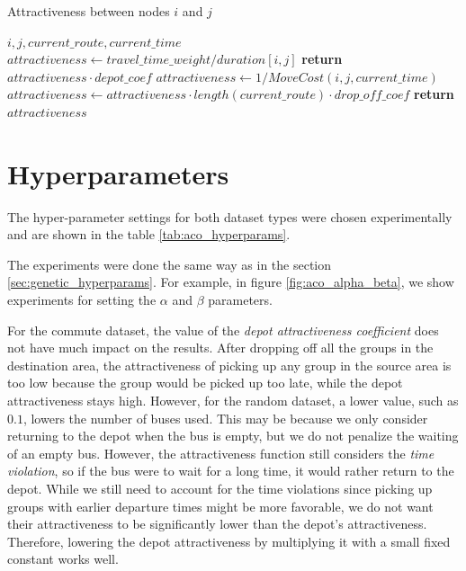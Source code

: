 \begin{algorithm}
\caption{Attractiveness between nodes $i$ and $j$}
\label{alg:aco_attractiveness}
\begin{algorithmic}
\Require $i, j, current\_route, current\_time$
    \State $attractiveness \gets {travel\_time\_weight} / {duration[i, j]}$ 
    \State \textbf{return} $attractiveness \cdot depot\_coef$ 
\EndIf
\State $attractiveness \gets 1 / MoveCost(i, j, current\_time)$  
    \State $attractiveness \gets attractiveness \cdot length(current\_route) \cdot drop\_off\_coef$
\EndIf
\State \textbf{return} $attractiveness$
\end{algorithmic}
\end{algorithm}

\section{Hyperparameters}\label{sec:aco_hyperparams}

The hyper-parameter settings for both dataset types were chosen experimentally and are shown in the table \ref{tab:aco_hyperparams}. 

The experiments were done the same way as in the section \ref{sec:genetic_hyperparams}. For example, in figure \ref{fig:aco_alpha_beta}, we show experiments for setting the $\alpha$ and $\beta$ parameters.

For the commute dataset, the value of the \textit{depot attractiveness coefficient} does not have much impact on the results. After dropping off all the groups in the destination area, the attractiveness of picking up any group in the source area is too low because the group would be picked up too late, while the depot attractiveness stays high. However, for the random dataset, a lower value, such as $0.1$, lowers the number of buses used. This may be because we only consider returning to the depot when the bus is empty, but we do not penalize the waiting of an empty bus. However, the attractiveness function still considers the \textit{time violation}, so if the bus were to wait for a long time, it would rather return to the depot. While we still need to account for the time violations since picking up groups with earlier departure times might be more favorable, we do not want their attractiveness to be significantly lower than the depot's attractiveness. Therefore, lowering the depot attractiveness by multiplying it with a small fixed constant works well.

